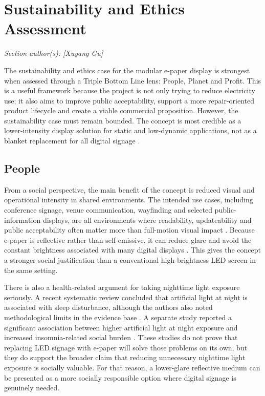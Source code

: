 \documentclass[11pt,a4paper]{article}
\begin{document}
\section{Sustainability and Ethics Assessment}
\textit{Section author(s): [Xuyang Gu]}

The sustainability and ethics case for the modular e-paper display is strongest when assessed through a Triple Bottom Line lens: People, Planet and Profit. This is a useful framework because the project is not only trying to reduce electricity use; it also aims to improve public acceptability, support a more repair-oriented product lifecycle and create a viable commercial proposition. However, the sustainability case must remain bounded. The concept is most credible as a lower-intensity display solution for static and low-dynamic applications, not as a blanket replacement for all digital signage \cite{ref6}.

\subsection{People}

From a social perspective, the main benefit of the concept is reduced visual and operational intensity in shared environments. The intended use cases, including conference signage, venue communication, wayfinding and selected public-information displays, are all environments where readability, updateability and public acceptability often matter more than full-motion visual impact \cite{ref6}. Because e-paper is reflective rather than self-emissive, it can reduce glare and avoid the constant brightness associated with many digital displays \cite{ref2}. This gives the concept a stronger social justification than a conventional high-brightness LED screen in the same setting.

There is also a health-related argument for taking nighttime light exposure seriously. A recent systematic review concluded that artificial light at night is associated with sleep disturbance, although the authors also noted methodological limits in the evidence base \cite{ref30}. A separate study reported a significant association between higher artificial light at night exposure and increased insomnia-related social burden \cite{ref31}. These studies do not prove that replacing LED signage with e-paper will solve those problems on its own, but they do support the broader claim that reducing unnecessary nighttime light exposure is socially valuable. For that reason, a lower-glare reflective medium can be presented as a more socially responsible option where digital signage is genuinely needed.
\end{document}

